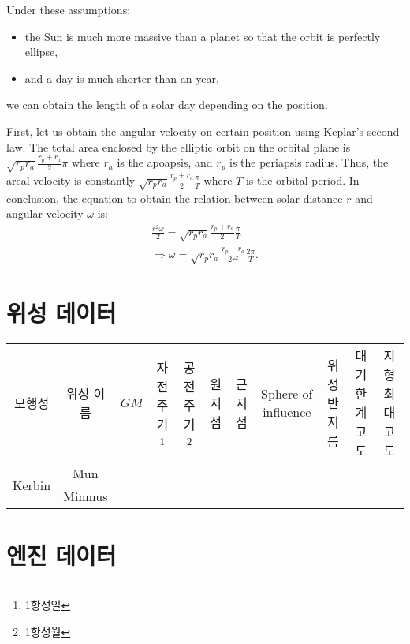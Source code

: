 Under these assumptions:
\begin{itemize}
\item the Sun is much more massive than a planet so that the orbit is perfectly ellipse,
\item and a day is much shorter than an year,
\end{itemize}
we can obtain the length of a solar day depending on the position.

First, let us obtain the angular velocity on certain position using Keplar's second law.
The total area enclosed by the elliptic orbit on the orbital plane is $\sqrt{r_p r_a}\frac{r_p+r_a}{2}\pi$ where $r_a$ is the apoapsis, and $r_p$ is the periapsis radius. Thus, the areal velocity is constantly $\sqrt{r_p r_a}\frac{r_p+r_a}{2}\frac{\pi}{T}$ where $T$ is the orbital period. In conclusion, the equation to obtain the relation between solar distance $r$ and angular velocity $\omega$ is:
\begin{align}
\frac{r^2 \omega}{2} = \sqrt{r_p r_a}\frac{r_p+r_a}{2}\frac{\pi}{T}
\\\nonumber\Rightarrow \omega = \sqrt{r_p r_a}\frac{r_p+r_a}{2r^2}\frac{2\pi}{T}.
\end{align}



\section{위성 데이터}

\begin{tabular}{|c|c|c|c|c|c|c|c|c|c|c|}
모행성&위성 이름& $GM$& 자전주기\footnote{1항성일}& 공전주기\footnote{1항성월}& 원지점&근지점&Sphere of influence&위성 반지름& 대기한계고도 & 지형 최대고도
\\
\multirow{2}{*}{Kerbin}& Mun
\\&Minmus
\end{tabular}
\section{엔진 데이터}

